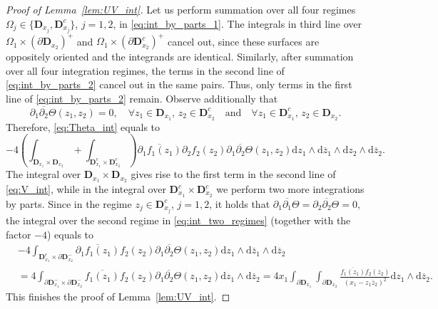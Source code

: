 \documentclass[10pt]{amsart}
\numberwithin{equation}{section}
\newcommand{\dif}{\mathrm{d}}
\newcommand{\DD}{\mathbf{D}}
\begin{document}
\begin{proof}[Proof of Lemma~\ref{lem:UV_int}]
Let us perform summation over all four regimes $\Omega_j\in\{\DD_{x_j},\DD_{x_j}^c\}$, $j=1,2$, in \eqref{eq:int_by_parts_1}. The integrals in third line over $\Omega_1\times (\partial \DD_{x_2})^+$ and $\Omega_1\times (\partial \DD_{x_2}^c)^+$ cancel out, since these surfaces are oppositely oriented and the integrands are identical. Similarly, after summation over all four integration regimes, the terms in the second line of \eqref{eq:int_by_parts_2} cancel out in the same pairs. Thus, only terms in the first line of \eqref{eq:int_by_parts_2} remain. Observe additionally that
\begin{equation}
\partial_1 \overline{\partial_2}\Theta(z_1,z_2) = 0,\quad\forall z_1\in \DD_{x_1},\, z_2\in \DD_{x_2}^c\quad\text{and}\quad \forall z_1\in \DD_{x_1}^c,\, z_2\in \DD_{x_2}.
\end{equation}
Therefore, \eqref{eq:Theta_int} equals to
\begin{equation}
-4\left(\int_{\DD_{x_1}\times \DD_{x_2}} +\int_{\DD_{x_1}^c\times \DD_{x_2}^c}\right) \overline{\partial_1f_1(z_1)} \partial_2 f_2(z_2) \partial_1\overline{\partial_{2}}\Theta(z_1,z_2) \dif z_1\wedge \dif \overline{z}_1 \wedge \dif z_2\wedge \dif \overline{z}_2.
\label{eq:int_two_regimes}
\end{equation}
The integral over $\DD_{x_1}\times \DD_{x_2}$ gives rise to the first term in the second line of \eqref{eq:V_int}, while in the integral over $\DD_{x_1}^c\times \DD_{x_2}^c$ we perform two more integrations by parts. Since in the regime $z_j\in\DD_{x_j}^c$, $j=1,2$, it holds that $\partial_1\overline{\partial_1}\Theta=\partial_2\overline{\partial_2}\Theta=0$, the integral over the second regime in \eqref{eq:int_two_regimes} (together with the factor $-4$) equals to
\begin{equation}
\begin{split}
&-4\int_{\DD_{x_1}^c\times \partial\DD_{x_2}^-} \overline{\partial_1f_1(z_1)} f_2(z_2) \partial_1\overline{\partial_2}\Theta(z_1,z_2) \dif z_1\wedge \dif \overline{z}_1 \wedge \dif \overline{z}_2\\
&= 4\int_{\partial\DD_{x_1}^-\times \partial \DD_{x_2}^-} \overline{f_1(z_1)} f_2(z_2) \partial_1\overline{\partial_2}\Theta(z_1,z_2) \dif z_1\wedge \dif \overline{z}_2= 4x_1\int_{\partial\DD_{x_1}}\int_{\partial \DD_{x_2}} \frac{\overline{f_1(z_1)}f_2(z_2)}{(x_1-z_1\overline{z}_2)^2}\dif z_1\wedge \dif \overline{z}_2.
\end{split}
\end{equation}
This finishes the proof of Lemma~\ref{lem:UV_int}.
\end{proof}
\end{document}
